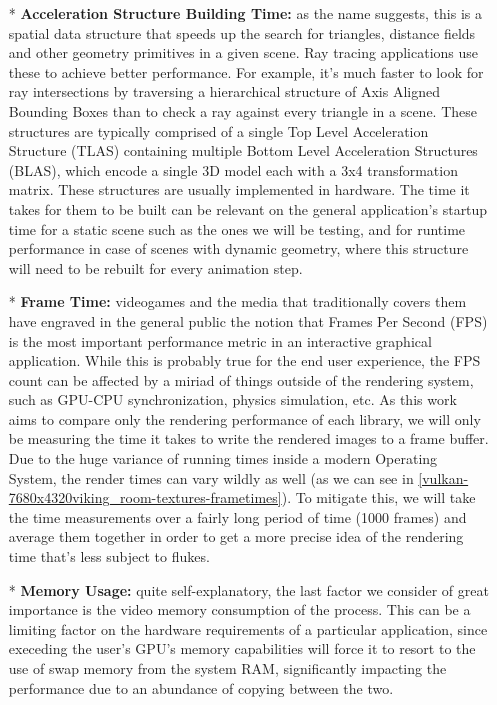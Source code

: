 \begin{itemize}
    \item[*]\textbf{Acceleration Structure Building Time:} as the name suggests, this is a spatial data structure that speeds up the search for triangles, distance fields and other geometry primitives in a given scene. Ray tracing applications use these to achieve better performance. For example, it's much faster to look for ray intersections by traversing a hierarchical structure of Axis Aligned Bounding Boxes than to check a ray against every triangle in a scene. These structures are typically comprised of a single Top Level Acceleration Structure (TLAS) containing multiple Bottom Level Acceleration Structures (BLAS), which encode a single 3D model each with a 3x4 transformation matrix. These structures are usually implemented in hardware. The time it takes for them to be built can be relevant on the general application's startup time for a static scene such as the ones we will be testing, and for runtime performance in case of scenes with dynamic geometry, where this structure will need to be rebuilt for every animation step.
    \item[*]\textbf{Frame Time:} videogames and the media that traditionally covers them have engraved in the general public the notion that Frames Per Second (FPS) is the most important performance metric in an interactive graphical application. While this is probably true for the end user experience, the FPS count can be affected by a miriad of things outside of the rendering system, such as GPU-CPU synchronization, physics simulation, etc. As this work aims to compare only the rendering performance of each library, we will only be measuring the time it takes to write the rendered images to a frame buffer. Due to the huge variance of running times inside a modern Operating System, the render times can vary wildly as well (as we can see in \ref{vulkan-7680x4320viking_room-textures-frametimes}). To mitigate this, we will take the time measurements over a fairly long period of time (1000 frames) and average them together in order to get a more precise idea of the rendering time that's less subject to flukes.
    \item[*]\textbf{Memory Usage:} quite self-explanatory, the last factor we consider of great importance is the video memory consumption of the process. This can be a limiting factor on the hardware requirements of a particular application, since execeding the user's GPU's memory capabilities will force it to resort to the use of swap memory from the system RAM, significantly impacting the performance due to an abundance of copying between the two.
\end{itemize}

